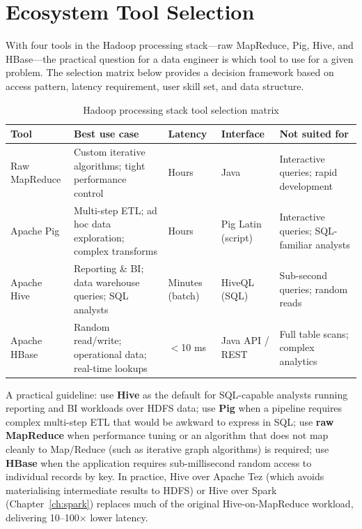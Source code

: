 \section{Ecosystem Tool Selection}
\label{sec:tool-selection}

With four tools in the Hadoop processing stack---raw MapReduce, Pig,
Hive, and HBase---the practical question for a data engineer is which
tool to use for a given problem. The selection matrix below provides
a decision framework based on access pattern, latency requirement,
user skill set, and data structure.

\begin{table}[h!t]
\centering
\caption{Hadoop processing stack tool selection matrix}
\label{tab:tool-selection}
\renewcommand{\arraystretch}{1.55}
\begin{tabular}{L{2.2cm} L{2.6cm} L{1.6cm} L{1.4cm} L{3.0cm}}
\toprule
\textbf{Tool} & \textbf{Best use case} & \textbf{Latency} & \textbf{Interface} & \textbf{Not suited for} \\
\midrule
Raw MapReduce & Custom iterative algorithms; tight performance control & Hours & Java & Interactive queries; rapid development \\
Apache Pig    & Multi-step ETL; ad hoc data exploration; complex transforms & Hours & Pig Latin (script) & Interactive queries; SQL-familiar analysts \\
Apache Hive   & Reporting \& BI; data warehouse queries; SQL analysts & Minutes (batch) & HiveQL (SQL) & Sub-second queries; random reads \\
Apache HBase  & Random read/write; operational data; real-time lookups & $<$10 ms & Java API / REST & Full table scans; complex analytics \\
\bottomrule
\end{tabular}
\end{table}

A practical guideline: use \textbf{Hive} as the default for SQL-capable
analysts running reporting and BI workloads over HDFS data;
use \textbf{Pig} when a pipeline requires complex multi-step ETL
that would be awkward to express in SQL; use \textbf{raw MapReduce}
when performance tuning or an algorithm that does not map cleanly to
Map/Reduce (such as iterative graph algorithms) is required; use
\textbf{HBase} when the application requires sub-millisecond random
access to individual records by key. In practice, Hive over Apache
Tez (which avoids materialising intermediate results to HDFS) or
Hive over Spark (Chapter~\ref{ch:spark}) replaces much of the original
Hive-on-MapReduce workload, delivering 10--100$\times$ lower latency.

